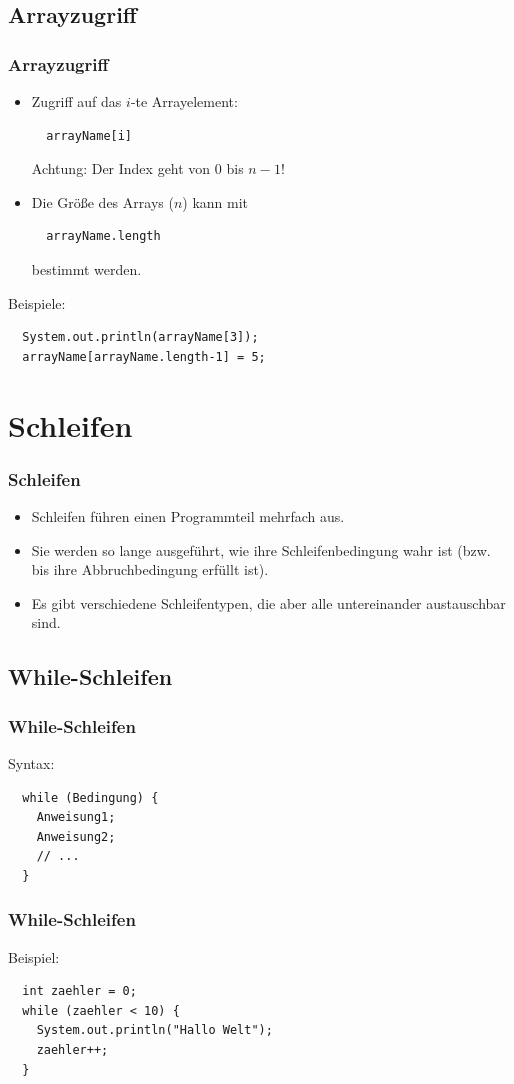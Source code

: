 \documentclass[final]{beamer}
\begin{document}
\subsection{Arrayzugriff}
\begin{frame}[containsverbatim]
  \frametitle{Arrayzugriff}
\begin{itemize}
  \item{Zugriff auf das $i$-te Arrayelement:
	\begin{lstlisting}
  arrayName[i]
	\end{lstlisting}
  Achtung: Der Index geht von $0$ bis $n-1$!
  }
  \item{Die Größe des Arrays ($n$) kann mit
	\begin{lstlisting}
  arrayName.length
	\end{lstlisting}
	bestimmt werden.
	}
  \end{itemize}

  Beispiele:
  \begin{lstlisting}
  System.out.println(arrayName[3]);
  arrayName[arrayName.length-1] = 5;
  \end{lstlisting}
\end{frame}

\section{Schleifen}
\begin{frame}
  \frametitle{Schleifen}
  \begin{itemize}
	\item{Schleifen führen einen Programmteil mehrfach aus.}
	\item{Sie werden so lange ausgeführt, wie ihre Schleifenbedingung wahr ist
	  (bzw. bis ihre Abbruchbedingung erfüllt ist).}
	\item{Es gibt verschiedene Schleifentypen, die aber alle untereinander austauschbar sind.}
  \end{itemize}
\end{frame}

\subsection{While-Schleifen}
\begin{frame}[containsverbatim]
  \frametitle{While-Schleifen}
  Syntax:
  \begin{lstlisting}
  while (Bedingung) {
	Anweisung1;
	Anweisung2;
	// ...
  }
  \end{lstlisting}
\end{frame}
\begin{frame}[containsverbatim]
  \frametitle{While-Schleifen}
  Beispiel:
  \begin{lstlisting}
  int zaehler = 0;
  while (zaehler < 10) {
	System.out.println("Hallo Welt");
	zaehler++;
  }
  \end{lstlisting}
\end{frame}
\end{document}
